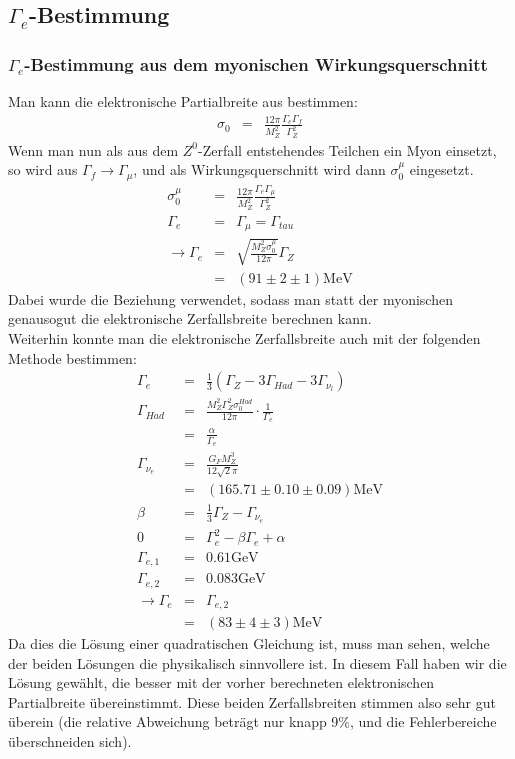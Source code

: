 \subsection{$\Gamma_e$-Bestimmung}
\subsubsection{$\Gamma_e$-Bestimmung aus dem myonischen Wirkungsquerschnitt}
Man kann die elektronische Partialbreite aus \cite[Gl.5]{script} bestimmen:
\begin{eqnarray}
 \sigma_0 &=& \frac{12\pi}{M_Z^2}\frac{\Gamma_e\Gamma_f}{\Gamma_Z^2}
\end{eqnarray}
Wenn man nun als aus dem $Z^0$-Zerfall entstehendes Teilchen ein Myon einsetzt, so wird aus $\Gamma_f\rightarrow\Gamma_{\mu}$, und als Wirkungsquerschnitt wird dann $\sigma_0^{\mu}$ eingesetzt.
\begin{eqnarray}
\sigma_0^{\mu} &=& \frac{12\pi}{M_Z^2}\frac{\Gamma_e\Gamma_{\mu}}{\Gamma_Z^2}\\
 \Gamma_e &=& \Gamma_{\mu} = \Gamma_{tau}\\
 \rightarrow \Gamma_e &=& \sqrt{\frac{M_Z^2\sigma_0^{\mu}}{12\pi}}\Gamma_Z\\
 &=& (91 \pm 2 \pm 1)\si{\mega\electronvolt}
\end{eqnarray}
Dabei wurde die Beziehung \cite[Gl.9]{script} verwendet, sodass man statt der myonischen genausogut die elektronische Zerfallsbreite berechnen kann.\\
Weiterhin konnte man die elektronische Zerfallsbreite auch mit der folgenden Methode bestimmen:
\begin{eqnarray}
\Gamma_e &=& \frac{1}{3}(\Gamma_Z - 3\Gamma_{Had} - 3\Gamma_{\nu_l})\\
\Gamma_{Had} &=& \frac{M_Z^2\Gamma_Z^2\sigma_0^{Had}}{12\pi}\cdot\frac{1}{\Gamma_e}\\
&=& \frac{\alpha}{\Gamma_e}\\
\Gamma_{\nu_e} &=& \frac{G_FM_Z^3}{12\sqrt{2}\pi}\\
\nonumber &=& (165.71 \pm 0.10 \pm 0.09)\si{\mega\electronvolt}\\
\beta &=& \frac{1}{3}\Gamma_Z - \Gamma_{\nu_e}\\
0 &=& \Gamma_e^2 - \beta\Gamma_e + \alpha\\
\nonumber \Gamma_{e,1} &=& 0.61\si{\giga\electronvolt}\\
\nonumber \Gamma_{e,2} &=& 0.083\si{\giga\electronvolt}\\
\rightarrow \Gamma_e &=& \Gamma_{e,2}\\
\nonumber &=& (83 \pm 4 \pm 3) \si{\mega\electronvolt}
\end{eqnarray}
Da dies die Lösung einer quadratischen Gleichung ist, muss man sehen, welche der beiden Lösungen die physikalisch sinnvollere ist. In diesem Fall haben wir die Lösung gewählt, die besser mit der vorher berechneten elektronischen Partialbreite übereinstimmt. Diese beiden Zerfallsbreiten stimmen also sehr gut überein (die relative Abweichung beträgt nur knapp 9\si{\percent}, und die Fehlerbereiche überschneiden sich).

